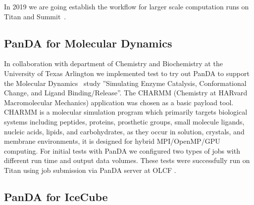 \documentclass{webofc}
\begin{document}
In 2019 we are going establish the workflow for larger scale computation runs on Titan and Summit~\cite{Summit}.

\subsection{PanDA for Molecular Dynamics} \label{section_moldyn}

In collaboration with department of Chemistry and Biochemistry at the University of Texas Arlington we implemented test to try out PanDA to support the Molecular Dynamics~\cite{3b6dad414e794d36954333f8f177f47c} study ''Simulating Enzyme Catalysis, Conformational Change, and Ligand Binding/Release''. 
The CHARMM (Chemistry at HARvard Macromolecular Mechanics) application was chosen as a basic payload tool. 
CHARMM is a molecular simulation program which primarily targets biological systems including peptides, proteins, prosthetic groups, small molecule ligands, nucleic acids, lipids, and carbohydrates, as they occur in solution, crystals, and membrane environments, it is designed for hybrid MPI/OpenMP/GPU computing.
For initial tests with PanDA we configured two types of jobs with different run time and output data volumes. 
These tests were successfully run on Titan using job submission via PanDA server at OLCF .


\subsection{PanDA for IceCube} \label{section_icecube}
\end{document}

